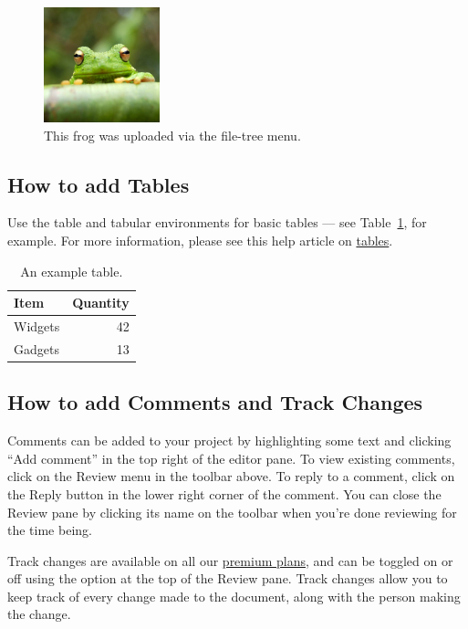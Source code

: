 \documentclass{article}
\begin{document}
\begin{figure}
\centering
\includegraphics[width=0.3\textwidth]{frog.jpg}
\caption{\label{fig:frog}This frog was uploaded via the file-tree menu.}
\end{figure}

\subsection{How to add Tables}

Use the table and tabular environments for basic tables --- see Table~\ref{tab:widgets}, for example. For more information, please see this help article on \href{https://www.overleaf.com/learn/latex/tables}{tables}. 

\begin{table}
\centering
\begin{tabular}{l|r}
Item & Quantity \\\hline
Widgets & 42 \\
Gadgets & 13
\end{tabular}
\caption{\label{tab:widgets}An example table.}
\end{table}

\subsection{How to add Comments and Track Changes}

Comments can be added to your project by highlighting some text and clicking ``Add comment'' in the top right of the editor pane. To view existing comments, click on the Review menu in the toolbar above. To reply to a comment, click on the Reply button in the lower right corner of the comment. You can close the Review pane by clicking its name on the toolbar when you're done reviewing for the time being.

Track changes are available on all our \href{https://www.overleaf.com/user/subscription/plans}{premium plans}, and can be toggled on or off using the option at the top of the Review pane. Track changes allow you to keep track of every change made to the document, along with the person making the change. 
\end{document}

